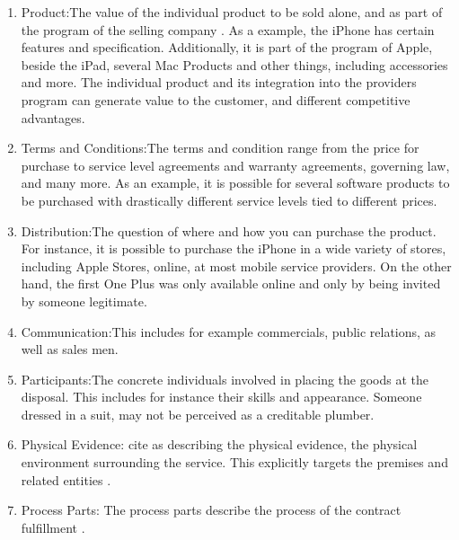 \begin{enumerate}
    \item{Product:}The value of the individual product to be sold alone, and as part of the program of the selling company \parencite[cf.][398]{Meffert.2015}. As a example, the iPhone has certain features and specification. Additionally, it is part of the program of Apple, beside the iPad, several Mac Products and other things, including accessories and more. The individual product and its integration into the providers program can generate value to the customer, and different competitive advantages.
    \item{Terms and Conditions:}The terms and condition range from the price for purchase to service level agreements and warranty agreements, governing law, and many more. As an example, it is possible for several software products to be purchased with drastically different service levels tied to different prices. 
    \item{Distribution:}The question of where and how you can purchase the product. For instance, it is possible to purchase the iPhone in a wide variety of stores, including Apple Stores, online, at most mobile service providers. On the other hand, the first One Plus was only available online and only by being invited by someone legitimate.
    \item{Communication:}This includes for example commercials, public relations, as well as sales men.
    \item{Participants:}The concrete individuals involved in placing the goods at the disposal. This includes for instance their skills and appearance. Someone dressed in a suit, may not be perceived as a creditable plumber. 
    \item{Physical Evidence:} \textcite[155]{AzilaGbettor2013} cite \textcite{Booms.1981} as describing the physical evidence, the physical environment surrounding the service. This explicitly targets the premises and related entities \parencite[cf.]{Hoepner2015}.
    \item{Process Parts:}
    The process parts describe the process of the contract fulfillment \parencite{Hoepner2015}.
\end{enumerate}

